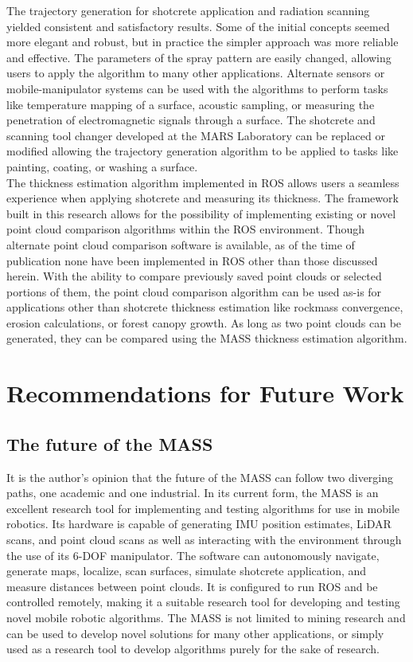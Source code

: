 The trajectory generation for shotcrete application and radiation scanning yielded consistent and satisfactory results. Some of the initial concepts seemed more elegant and robust, but in practice the simpler approach was more reliable and effective. The parameters of the spray pattern are easily changed, allowing users to apply the algorithm to many other applications. Alternate sensors or mobile-manipulator systems can be used with the algorithms to perform tasks like temperature mapping of a surface, acoustic sampling, or measuring the penetration of electromagnetic signals through a surface. The shotcrete and scanning tool changer developed at the MARS Laboratory can be replaced or modified allowing the trajectory generation algorithm to be applied to tasks like painting, coating, or washing a surface.\\

The thickness estimation algorithm implemented in ROS allows users a seamless experience when applying shotcrete and measuring its thickness. The framework built in this research allows for the possibility of implementing existing or novel point cloud comparison algorithms within the ROS environment. Though alternate point cloud comparison software is available, as of the time of publication none have been implemented in ROS other than those discussed herein. With the ability to compare previously saved point clouds or selected portions of them, the point cloud comparison algorithm can be used as-is for applications other than shotcrete thickness estimation like rockmass convergence, erosion calculations, or forest canopy growth. As long as two point clouds can be generated, they can be compared using the MASS thickness estimation algorithm.\\

\section{Recommendations for Future Work}
\subsection{The future of the MASS}

It is the author's opinion that the future of the MASS can follow two diverging paths, one academic and one industrial. In its current form, the MASS is an excellent research tool for implementing and testing algorithms for use in mobile robotics. Its hardware is capable of generating IMU position estimates, LiDAR scans, and point cloud scans as well as interacting with the environment through the use of its 6-DOF manipulator. The software can autonomously navigate, generate maps, localize, scan surfaces, simulate shotcrete application, and measure distances between point clouds. It is configured to run ROS and be controlled remotely, making it a suitable research tool for developing and testing novel mobile robotic algorithms. The MASS is not limited to mining research and can be used to develop novel solutions for many other applications, or simply used as a research tool to develop algorithms purely for the sake of research.\\

